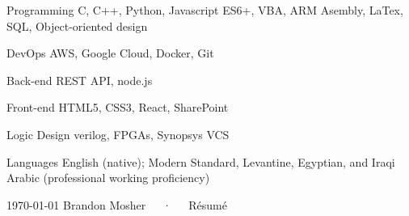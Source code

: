 \documentclass[11pt, a4paper]{cv}
\newenvironment{projects}{}{\par}
\newenvironment{skillsets}{}{\par}
\newenvironment{cv}{}{\par}
\begin{document}
\begin{cv}
\begin{projects}
\begin{cventries}
{\begin{cvparagraph}
\end{cvparagraph}}
\end{cventries}
\end{projects}
\begin{skillsets}
\begin{cventries}
\cvskillset
{Programming}
{C, C++, Python, Javascript ES6+, VBA, ARM Asembly, LaTex, SQL, Object-oriented design}
\par
\cvskillset
{DevOps}
{AWS, Google Cloud, Docker, Git}
\par
\cvskillset
{Back-end}
{REST API, node.js}
\par
\cvskillset
{Front-end}
{HTML5, CSS3, React, SharePoint}
\par
\cvskillset
{Logic Design}
{verilog, FPGAs, Synopsys VCS}
\par
\cvskillset
{Languages}
{English (native); Modern Standard, Levantine, Egyptian, and Iraqi Arabic (professional working proficiency)}
\par
\end{cventries}
\end{skillsets}
\end{cv}
\makefooter
{\today}
{Brandon Mosher~~~·~~~Résumé}
{\thepage}
\end{document}
